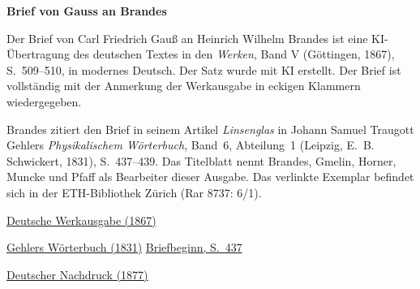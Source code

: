 \clearpage
\thispagestyle{empty}
\begin{center}\Large\textbf{Brief von Gauss an Brandes}\end{center}

Der Brief von Carl Friedrich Gauß an Heinrich Wilhelm Brandes ist eine KI-Übertragung des deutschen Textes in den \textit{Werken}, Band V (Göttingen, 1867), S.~509--510, in modernes Deutsch. Der Satz wurde mit KI erstellt. Der Brief ist vollständig mit der Anmerkung der Werkausgabe in eckigen Klammern wiedergegeben.

Brandes zitiert den Brief in seinem Artikel \textit{Linsenglas} in Johann Samuel Traugott Gehlers \textit{Physikalischem Wörterbuch}, Band~6, Abteilung~1 (Leipzig, E.~B. Schwickert, 1831), S.~437--439. Das Titelblatt nennt Brandes, Gmelin, Horner, Muncke und Pfaff als Bearbeiter dieser Ausgabe. Das verlinkte Exemplar befindet sich in der ETH-Bibliothek Zürich (Rar 8737: 6/1).

\medskip\noindent
\href{https://gdz.sub.uni-goettingen.de/id/PPN236006339}{Deutsche Werkausgabe (1867)}\par
\noindent\href{https://www.e-rara.ch/zut/content/titleinfo/2538108}{Gehlers Wörterbuch (1831)}\quad
\href{https://www.e-rara.ch/i3f/v20/2538554/full/1300,/0/default.jpg}{Briefbeginn, S.~437}\par
\noindent\href{https://doi.org/10.1007/978-3-642-49319-5_25}{Deutscher Nachdruck (1877)}
\clearpage
